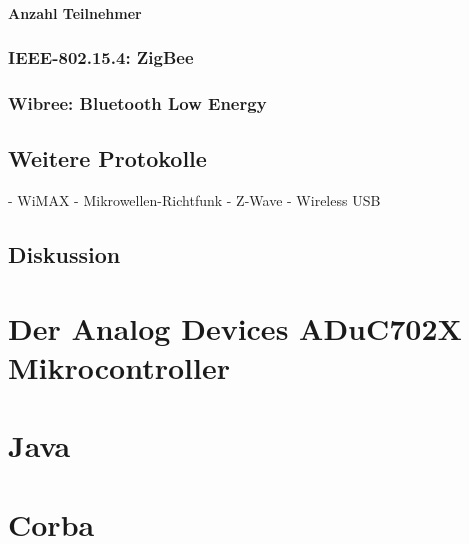        \paragraph{Anzahl Teilnehmer}
    \subsubsection{IEEE-802.15.4: ZigBee}
    \subsubsection{Wibree: Bluetooth Low Energy}\label{wibree}
    \subsection{Weitere Protokolle}
        - WiMAX
        - Mikrowellen-Richtfunk
        - Z-Wave
        - Wireless USB

    \subsection{Diskussion}

\section{Der Analog Devices ADuC702X Mikrocontroller}
\section{Java}
\section{Corba}
